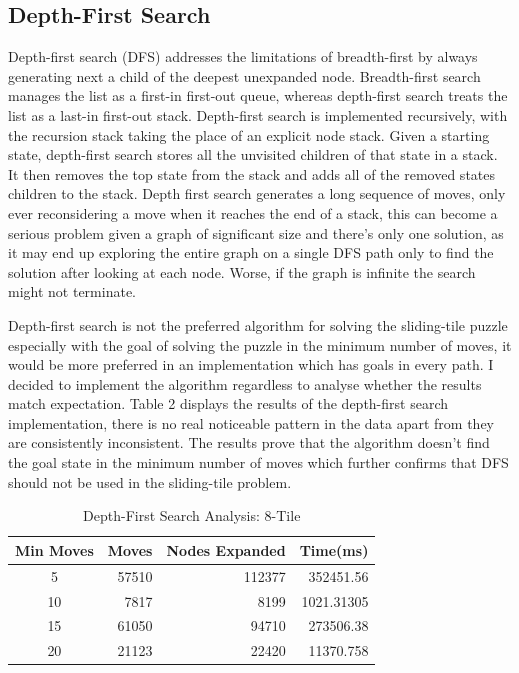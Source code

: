 \documentclass[progress]{cmpreport}
\begin{document}
\subsection{Depth-First Search}
Depth-first search (DFS) addresses the limitations of breadth-first by always generating next a child of the deepest unexpanded node. Breadth-first search manages the list as a first-in first-out queue, whereas depth-first search treats the list as a last-in first-out stack. Depth-first search is implemented recursively, with the recursion stack taking the place of an explicit node stack. Given a starting state, depth-first search stores all the unvisited children of that state in a stack. It then removes the top state from the stack and adds all of the removed states children to the stack. Depth first search generates a long sequence of moves, only ever reconsidering a move when it reaches the end of a stack, this can become a serious problem given a graph of significant size and there's only one solution, as it may end up exploring the entire graph on a single DFS path only to find the solution after looking at each node. Worse, if the graph is infinite the search might not terminate.



Depth-first search is not the preferred algorithm for solving the sliding-tile puzzle especially with the goal of solving the puzzle in the minimum number of moves, it would be more preferred in an implementation which has goals in every path. I decided to implement the algorithm regardless to analyse whether the results match expectation. Table 2 displays the results of the depth-first search implementation, there is no real noticeable pattern in the data apart from they are consistently inconsistent. The results prove that the algorithm doesn't find the goal state in the minimum number of moves which further confirms that DFS should not be used in the sliding-tile problem. 

\begin{table}[ht]
	\caption{Depth-First Search Analysis: 8-Tile}
	\begin{center}
		\begin{tabular}{crrr} \hline
			Min Moves & Moves & Nodes Expanded &Time(ms)  \\ \hline
			5  & 57510 & 112377 & 352451.56 \\
			10 & 7817 &8199&  1021.31305 \\ 
			15 & 61050 & 94710& 273506.38 \\ 
			20 & 21123& 22420 & 11370.758 \\ \hline
		\end{tabular}
	\end{center}
\end{table}
\end{document}

